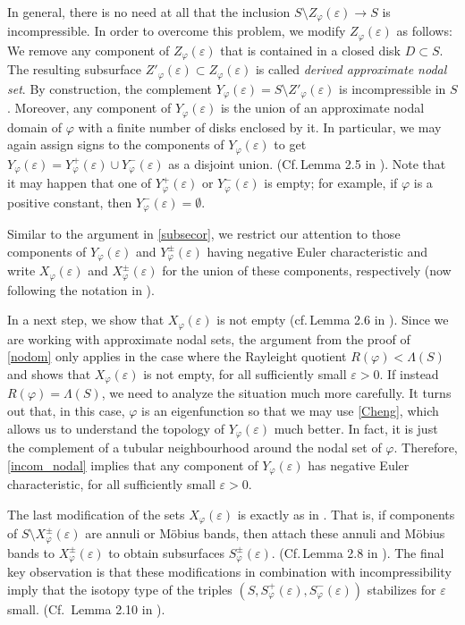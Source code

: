 \documentclass[a4paper,11pt]{amsart}
\numberwithin{equation}{section}
\theoremstyle{definition}
\def\ve{\varepsilon}
\def\vf{\varphi}
\begin{document}
In general, there is no need at all that the inclusion $S \setminus Z_\varphi(\ve) \to S$ is incompressible.
In order to overcome this problem, we modify $Z_\varphi(\ve)$ as follows: 
We remove any component of $Z_\varphi(\ve)$ that is contained in a closed disk $D \subset S$.
The resulting subsurface $Z'_\varphi(\ve) \subset Z_\varphi(\ve)$ is called
\emph{derived approximate nodal set}.
By construction, the complement $Y_\varphi(\ve)=S\setminus Z'_\varphi(\ve)$ is incompressible in $S$.
Moreover, any component of $Y_\vf(\ve)$ is the union of an approximate nodal domain of $\vf$ with a finite number of disks enclosed by it.
In particular, we may again assign signs to the components of $Y_\vf(\ve)$ to get $Y_\vf(\ve)=Y_\vf^+(\ve)\cup Y_\vf^-(\ve)$ as a disjoint union.
(Cf.\,Lemma 2.5 in \cite{BMM1}).
Note that it may happen that one of $Y_\vf^+(\ve)$ or $Y_\vf^-(\ve)$ is empty;
for example, if $\vf$ is a positive constant, then $Y_\vf^-(\ve)=\emptyset$.

Similar to the argument in \cref{subsecor}, we restrict our attention to those components of $Y_\varphi(\ve)$ and $Y_\varphi^\pm(\ve)$ having negative Euler characteristic and write $X_\varphi(\ve)$ and $X_\varphi^\pm (\ve)$ for the union of these components, respectively
(now following the notation in \cite{BMM2}).

In a next step, we show that $X_\varphi(\ve)$ is not empty (cf.\,Lemma 2.6 in \cite{BMM1}).
Since we are working with approximate nodal sets, the argument from the proof of \cref{nodom} only applies in the case where the Rayleight quotient $R(\varphi)<\Lambda(S)$ and shows that $X_\varphi(\ve)$ is not empty, for all sufficiently small $\ve>0$.
If instead $R(\varphi)=\Lambda(S)$, we need to analyze the situation much more carefully.
It turns out that, in this case, $\varphi$ is an eigenfunction so that we may use \cref{Cheng}, which allows us to understand the topology of $Y_\varphi(\ve)$ much better.
In fact, it is just the complement of a tubular neighbourhood around the nodal set of $\vf$.
Therefore, \cref{incom_nodal} implies that any component of $Y_\varphi(\ve)$ has negative Euler characteristic, for all sufficiently small $\ve>0$.

The last modification of the sets $X_\varphi(\ve)$ is exactly as in \cite{OR}.
That is, if components of $S\setminus X_\varphi^\pm(\ve)$ are annuli or M\"obius bands,
then attach these annuli and M\"obius bands to $X_\varphi^\pm(\ve)$ to obtain subsurfaces $S_\vf^\pm(\ve)$.
(Cf.\,Lemma 2.8 in \cite{BMM1}).
The final key observation is that these modifications in combination with incompressibility imply that the isotopy type of the triples $(S,S_\varphi^+(\ve),S_\varphi^-(\ve))$ stabilizes for $\ve$ small. (Cf.\ Lemma 2.10 in \cite{BMM1}).
\end{document}
